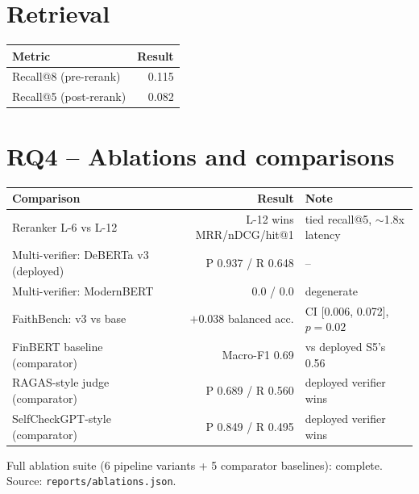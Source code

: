 \documentclass[11pt]{article}
\begin{document}
\section*{Retrieval}
\begin{table}[h!]
\centering
\begin{tabular}{lr}
\toprule
Metric & Result \\
\midrule
Recall@8 (pre-rerank) & 0.115 \\
Recall@5 (post-rerank) & 0.082 \\
\bottomrule
\end{tabular}
\end{table}

\section*{RQ4 -- Ablations and comparisons}
\begin{table}[h!]
\centering
\begin{tabular}{lrl}
\toprule
Comparison & Result & Note \\
\midrule
Reranker L-6 vs L-12 & L-12 wins MRR/nDCG/hit@1 & tied recall@5, $\sim$1.8x latency \\
Multi-verifier: DeBERTa v3 (deployed) & P 0.937 / R 0.648 & -- \\
Multi-verifier: ModernBERT & 0.0 / 0.0 & degenerate \\
FaithBench: v3 vs base & $+0.038$ balanced acc. & CI [0.006, 0.072], $p=0.02$ \\
FinBERT baseline (comparator) & Macro-F1 0.69 & vs deployed S5's 0.56 \\
RAGAS-style judge (comparator) & P 0.689 / R 0.560 & deployed verifier wins \\
SelfCheckGPT-style (comparator) & P 0.849 / R 0.495 & deployed verifier wins \\
\bottomrule
\end{tabular}
\end{table}
\noindent Full ablation suite (6 pipeline variants + 5 comparator baselines): complete.
Source: \texttt{reports/ablations.json}.
\end{document}
